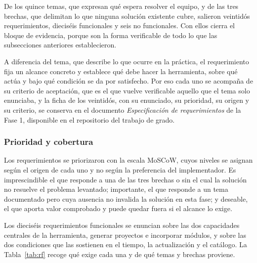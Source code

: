 De los quince temas, que expresan qué espera resolver el equipo, y de las tres
brechas, que delimitan lo que ninguna solución existente cubre, salieron
veintidós requerimientos, dieciséis funcionales y seis no funcionales. Con
ellos cierra el bloque de evidencia, porque son la forma verificable de todo
lo que las subsecciones anteriores establecieron.

A diferencia del tema, que describe lo que ocurre en la práctica, el
requerimiento fija un alcance concreto y establece qué debe hacer la
herramienta, sobre qué actúa y bajo qué condición se da por satisfecho. Por
eso cada uno se acompaña de su criterio de aceptación, que es el que vuelve
verificable aquello que el tema solo enunciaba, y la ficha de los veintidós,
con su enunciado, su prioridad, su origen y su criterio, se conserva en el
documento \emph{Especificación de requerimientos} de la Fase 1, disponible en
el repositorio del trabajo de grado.

\subsubsection*{Prioridad y cobertura}

Los requerimientos se priorizaron con la escala MoSCoW, cuyos niveles se
asignan según el origen de cada uno y no según la preferencia del
implementador. Es imprescindible el que responde a una de las tres brechas o
sin el cual la solución no resuelve el problema levantado; importante, el que
responde a un tema documentado pero cuya ausencia no invalida la
solución en esta fase; y deseable, el que aporta valor comprobado y puede
quedar fuera si el alcance lo exige.

Los dieciséis requerimientos funcionales se enuncian sobre las dos capacidades
centrales de la herramienta, generar proyectos e incorporar módulos, y sobre
las dos condiciones que las sostienen en el tiempo, la actualización y el
catálogo. La Tabla~\ref{tab:rf} recoge qué exige cada una y de qué temas y
brechas proviene.

